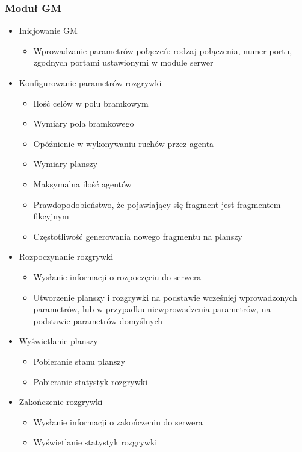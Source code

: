 \documentclass[../Dokumentacja.tex]{subfiles}
\begin{document}
\subsubsection{Moduł GM}
\begin{itemize}
	\item Inicjowanie GM
	\begin{itemize}
		\item Wprowadzanie parametrów połączeń: rodzaj połączenia, numer portu, zgodnych portami ustawionymi w module serwer
	\end{itemize}
	\item Konfigurowanie parametrów rozgrywki
	\begin{itemize}
		\item Ilość celów w polu bramkowym
		\item Wymiary pola bramkowego
		\item Opóźnienie w wykonywaniu ruchów przez agenta
		\item Wymiary planszy
		\item Maksymalna ilość agentów
		\item Prawdopodobieństwo, że pojawiający się fragment jest fragmentem fikcyjnym
		\item Częstotliwość generowania nowego fragmentu na planszy
	\end{itemize}
	\item Rozpoczynanie rozgrywki
	\begin{itemize}
		\item Wysłanie informacji o rozpoczęciu do serwera
		\item Utworzenie planszy i rozgrywki na podstawie wcześniej wprowadzonych parametrów, lub w przypadku niewprowadzenia parametrów, na podstawie parametrów domyślnych
	\end{itemize}
	\item Wyświetlanie planszy
	\begin{itemize}
		\item Pobieranie stanu planszy
		\item Pobieranie statystyk rozgrywki
	\end{itemize}
	\item Zakończenie rozgrywki
	\begin{itemize}
		\item Wysłanie informacji o zakończeniu do serwera
		\item Wyświetlanie statystyk rozgrywki
	\end{itemize}
\end{itemize}
\end{document}
